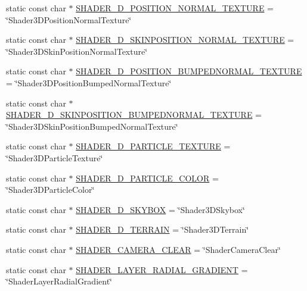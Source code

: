 \begin{Indent}
\begin{DoxyCompactItemize}
\item 
static const char $\ast$ \hyperlink{classGLProgram_ae6fb6c42d432db880dad3a236b858169}{S\+H\+A\+D\+E\+R\+\_\+D\+\_\+\+P\+O\+S\+I\+T\+I\+O\+N\+\_\+\+N\+O\+R\+M\+A\+L\+\_\+\+T\+E\+X\+T\+U\+RE} = \char`\"{}Shader3\+D\+Position\+Normal\+Texture\char`\"{}
\item 
static const char $\ast$ \hyperlink{classGLProgram_aa0b763d523d563d51190f957b6cce427}{S\+H\+A\+D\+E\+R\+\_\+D\+\_\+\+S\+K\+I\+N\+P\+O\+S\+I\+T\+I\+O\+N\+\_\+\+N\+O\+R\+M\+A\+L\+\_\+\+T\+E\+X\+T\+U\+RE} = \char`\"{}Shader3\+D\+Skin\+Position\+Normal\+Texture\char`\"{}
\item 
static const char $\ast$ \hyperlink{classGLProgram_a68025ba6979a633eb8e4b87e46e7ab8d}{S\+H\+A\+D\+E\+R\+\_\+D\+\_\+\+P\+O\+S\+I\+T\+I\+O\+N\+\_\+\+B\+U\+M\+P\+E\+D\+N\+O\+R\+M\+A\+L\+\_\+\+T\+E\+X\+T\+U\+RE} = \char`\"{}Shader3\+D\+Position\+Bumped\+Normal\+Texture\char`\"{}
\item 
static const char $\ast$ \hyperlink{classGLProgram_a98185a45e1f874dbceaf295b59bdf351}{S\+H\+A\+D\+E\+R\+\_\+D\+\_\+\+S\+K\+I\+N\+P\+O\+S\+I\+T\+I\+O\+N\+\_\+\+B\+U\+M\+P\+E\+D\+N\+O\+R\+M\+A\+L\+\_\+\+T\+E\+X\+T\+U\+RE} = \char`\"{}Shader3\+D\+Skin\+Position\+Bumped\+Normal\+Texture\char`\"{}
\item 
static const char $\ast$ \hyperlink{classGLProgram_aa3a4b3ce5ea10f92d110c2252ca0346e}{S\+H\+A\+D\+E\+R\+\_\+D\+\_\+\+P\+A\+R\+T\+I\+C\+L\+E\+\_\+\+T\+E\+X\+T\+U\+RE} = \char`\"{}Shader3\+D\+Particle\+Texture\char`\"{}
\item 
static const char $\ast$ \hyperlink{classGLProgram_ab81f4577b7db7f613d18669ba20d6eea}{S\+H\+A\+D\+E\+R\+\_\+D\+\_\+\+P\+A\+R\+T\+I\+C\+L\+E\+\_\+\+C\+O\+L\+OR} = \char`\"{}Shader3\+D\+Particle\+Color\char`\"{}
\item 
static const char $\ast$ \hyperlink{classGLProgram_a06f56df50953f5c48c39d16d5d0f076d}{S\+H\+A\+D\+E\+R\+\_\+D\+\_\+\+S\+K\+Y\+B\+OX} = \char`\"{}Shader3\+D\+Skybox\char`\"{}
\item 
static const char $\ast$ \hyperlink{classGLProgram_ac91cb951dcfd2bc3c0cdfa27837567a2}{S\+H\+A\+D\+E\+R\+\_\+D\+\_\+\+T\+E\+R\+R\+A\+IN} = \char`\"{}Shader3\+D\+Terrain\char`\"{}
\item 
static const char $\ast$ \hyperlink{classGLProgram_af1f6c61255a81a83707d7e3fe76cd9c1}{S\+H\+A\+D\+E\+R\+\_\+\+C\+A\+M\+E\+R\+A\+\_\+\+C\+L\+E\+AR} = \char`\"{}Shader\+Camera\+Clear\char`\"{}
\item 
static const char $\ast$ \hyperlink{classGLProgram_aafd2b851ce0d4e90e26cb2957fc3ab2d}{S\+H\+A\+D\+E\+R\+\_\+\+L\+A\+Y\+E\+R\+\_\+\+R\+A\+D\+I\+A\+L\+\_\+\+G\+R\+A\+D\+I\+E\+NT} = \char`\"{}Shader\+Layer\+Radial\+Gradient\char`\"{}
\end{DoxyCompactItemize}
\end{Indent}
